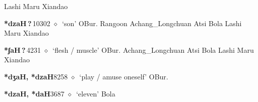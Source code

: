 \begin{list}{}{\leftmargin=1.5em \itemindent=-1.5em}
\hspace{1ex}
         Lashi 
\hspace{1ex}
         Maru 
\hspace{1ex}
         Xiandao 
  \item {\footnotesize \textbf{*dzaH\,?\,}}{\tiny 10302}
\hspace{1ex}
         $\diamond$~`son'
         OBur. 
\hspace{1ex}
         Rangoon 
\hspace{1ex}
         Achang\_Longchuan 
\hspace{1ex}
         Atsi 
\hspace{1ex}
         Bola 
\hspace{1ex}
         Lashi 
\hspace{1ex}
         Maru 
\hspace{1ex}
         Xiandao 
  \item {\footnotesize \textbf{*ʃaH\,?\,}}{\tiny 4231}
\hspace{1ex}
         $\diamond$~`flesh / muscle'
         OBur. 
\hspace{1ex}
         Achang\_Longchuan 
\hspace{1ex}
         Atsi 
\hspace{1ex}
         Bola 
\hspace{1ex}
         Lashi 
\hspace{1ex}
         Maru 
\hspace{1ex}
         Xiandao 
  \item {\footnotesize \textbf{*dʒaH, *dzaH}}{\tiny 8258}
\hspace{1ex}
         $\diamond$~`play / amuse oneself'
         OBur. 
  \item {\footnotesize \textbf{*dzaH, *daH}}{\tiny 3687}
\hspace{1ex}
         $\diamond$~`eleven'
         Bola 

\end{list}
